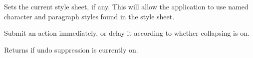 \label{wxrichtextbuffersetstylesheet}


Sets the current style sheet, if any. This will allow the application to use
named character and paragraph styles found in the style sheet.

\label{wxrichtextbuffersubmitaction}


Submit an action immediately, or delay it according to whether collapsing is on.

\label{wxrichtextbuffersuppressingundo}


Returns \true if undo suppression is currently on.

